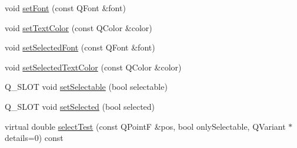 \begin{DoxyCompactItemize}
\item 
void \hyperlink{classQCPAbstractLegendItem_a409c53455d8112f71d70c0c43eb10265}{set\-Font} (const \-Q\-Font \&font)
\item 
void \hyperlink{classQCPAbstractLegendItem_a6ebace6aaffaedcdab2d74e88acc2d1e}{set\-Text\-Color} (const \-Q\-Color \&color)
\item 
void \hyperlink{classQCPAbstractLegendItem_a91db5aee48617a9d3206e61376807365}{set\-Selected\-Font} (const \-Q\-Font \&font)
\item 
void \hyperlink{classQCPAbstractLegendItem_a4d01d008ee1a5bfe9905b0397a421936}{set\-Selected\-Text\-Color} (const \-Q\-Color \&color)
\item 
\-Q\-\_\-\-S\-L\-O\-T void \hyperlink{classQCPAbstractLegendItem_a9913ef48730551b696e7f98a2391c599}{set\-Selectable} (bool selectable)
\item 
\-Q\-\_\-\-S\-L\-O\-T void \hyperlink{classQCPAbstractLegendItem_a6eed93b0ab99cb3eabb043fb08179c2b}{set\-Selected} (bool selected)
\item 
virtual double \hyperlink{classQCPAbstractLegendItem_ad0480d5cad34627a294a2921caa4a62f}{select\-Test} (const \-Q\-Point\-F \&pos, bool only\-Selectable, \-Q\-Variant $\ast$details=0) const 
\end{DoxyCompactItemize}
